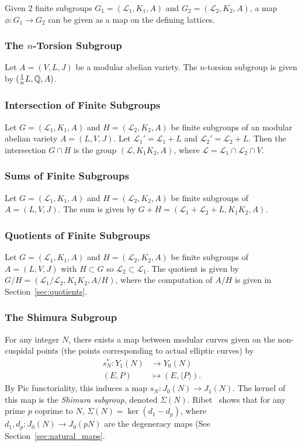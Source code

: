 \documentclass{article}
\begin{document}
Given 2 finite subgroups $G_1=(\mathcal{L}_1, K_1, A)$ and $G_2=(\mathcal{L}_2,
K_2, A)$, a map $\phi: G_1\to G_2$ can be given as a map on the defining
lattices.

\subsubsection{The $n$-Torsion Subgroup}

Let $A=(V, L, J)$ be a modular abelian variety. The $n$-torsion subgroup is
given by $(\frac{1}{n} L, \mathbb{Q}, A)$.

\subsubsection{Intersection of Finite Subgroups}
\label{sec:finitegroup_intersection}
Let $G=(\mathcal{L}_1, K_1, A)$ and $H=(\mathcal{L}_2, K_2, A)$ be finite
subgroups of an modular abelian variety $A=(L, V, J)$. Let $\mathcal{L}_1 ' =
\mathcal{L}_1+L$ and $\mathcal{L}_2 ' = \mathcal{L}_2 + L$. Then the
intersection $G\cap H$ is the group $(\mathcal{L}, K_1K_2, A)$, where
$\mathcal{L}=\mathcal{L}_1\cap \mathcal{L}_2 \cap V$.

\subsubsection{Sums of Finite Subgroups}

Let $G=(\mathcal{L}_1, K_1, A)$ and $H=(\mathcal{L}_2, K_2, A)$ be finite
subgroups of $A=(L, V, J)$. The sum is given by $G+H=(\mathcal{L}_1 +
\mathcal{L}_2+L, K_1K_2, A)$.

\subsubsection{Quotients of Finite Subgroups}

Let $G=(\mathcal{L}_1, K_1, A)$ and $H=(\mathcal{L}_2, K_2, A)$ be finite
subgroups of $A=(L, V, J)$ with $H\subset G$ so $\mathcal{L}_2\subset
\mathcal{L}_1$. The quotient is given by $G/H=(\mathcal{L}_1/\mathcal{L}_2,
K_1K_2, A/H)$, where the computation of $A/H$ is given in
Section~\ref{sec:quotients}.

\subsubsection{The Shimura Subgroup}

For any integer $N$, there exists a map between modular curves given
on the non-cuspidal points (the points corresponding to actual elliptic curves)
by
\begin{align*}
    s_N ^*: Y_1(N) & \to Y_0(N)                      \\
    (E, P)         & \mapsto (E, \langle P \rangle).
\end{align*}
By Pic functoriality, this induces a map $s_N: J_0(N)\to J_1(N)$. The kernel of
this map is the \emph{Shimura subgroup}, denoted $\Sigma(N)$.
Ribet~\cite[Theorem 4.3]{ribet:congrel} shows that for any prime $p$ coprime to
$N$, $\Sigma(N)=\ker(d_1 - d_p)$, where $d_1,d_p :J_0(N)\to J_0(pN)$ are the
degeneracy maps (See Section~\ref{sec:natural_maps}.
\end{document}
